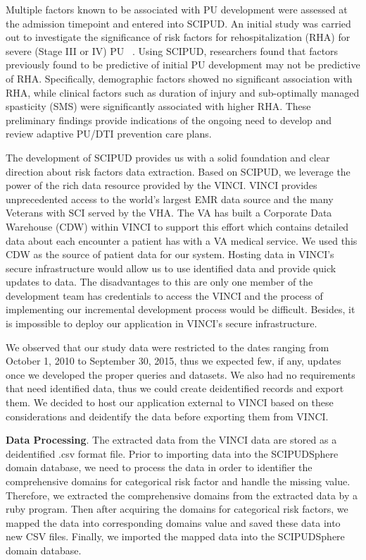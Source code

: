 \documentclass{amia}
\begin{document}
Multiple factors known to be associated with PU development were assessed at the admission timepoint and entered into SCIPUD. An initial study was carried out to investigate the significance of risk factors for rehospitalization (RHA) for severe (Stage III or IV) PU ~\cite{stages}. Using SCIPUD, researchers found that factors previously found to be predictive of initial PU development may not be predictive of RHA. Specifically, demographic factors showed no significant association with RHA, while clinical factors such as duration of injury and sub-optimally managed spasticity (SMS) were significantly associated with higher RHA. These preliminary findings provide indications of the ongoing need to develop and review adaptive PU/DTI prevention care plans. 

The development of SCIPUD provides us with a solid foundation and clear direction about risk factors data extraction. Based on SCIPUD, we leverage the power of the rich data resource provided by the VINCI. VINCI provides unprecedented access to the world’s largest EMR data source and the many Veterans with SCI served by the VHA. The VA has built a Corporate Data Warehouse (CDW) within VINCI to support this effort which contains detailed data about each encounter a patient has with a VA medical service. We used this CDW as the source of patient data for our system. Hosting data in VINCI's secure infrastructure would allow us to use identified data and provide quick updates to data. The disadvantages to this are only one member of the development team has credentials to access the VINCI and the process of implementing our incremental development process would be difficult. Besides, it is impossible to deploy our application in VINCI's secure infrastructure.

We observed that our study data were restricted to the dates ranging from October 1, 2010 to September 30, 2015, thus we expected few, if any, updates once we developed the proper queries and datasets. We also had no requirements that need identified data, thus we could create deidentified records and export them. We decided to host our application external to VINCI based on these considerations and deidentify the data before exporting them from VINCI.

{\bf Data Processing}. The extracted data from the VINCI data are stored as a deidentified .csv format file. Prior to importing data into the SCIPUDSphere domain database, we need to process the data in order to identifier the comprehensive domains for categorical risk factor and handle the missing value. Therefore, we extracted the comprehensive domains from the extracted data by a ruby program. Then after acquiring the domains for categorical risk factors, we mapped the data into corresponding domains value and saved these data into new CSV files. Finally, we imported the mapped data into the SCIPUDSphere domain database.
\end{document}
